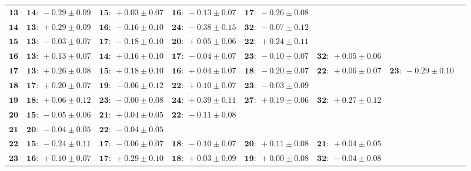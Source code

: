 \documentclass[letter,12pt]{article}
\begin{document}
\begin{landscape}
    \begin{table}[!h]
        \footnotesize
        \begin{tabular}{r|lllllll}
            \hline
            \( \mathbf{13} \)& \( \mathbf{14:}~-0.29 \pm 0.09 \)& \( \mathbf{15:}~+0.03 \pm 0.07 \)& \( \mathbf{16:}~-0.13 \pm 0.07 \)& \( \mathbf{17:}~-0.26 \pm 0.08 \)\\ 
            \( \mathbf{14} \)& \( \mathbf{13:}~+0.29 \pm 0.09 \)& \( \mathbf{16:}~-0.16 \pm 0.10 \)& \( \mathbf{24:}~-0.38 \pm 0.15 \)& \( \mathbf{32:}~-0.07 \pm 0.12 \)\\ 
            \( \mathbf{15} \)& \( \mathbf{13:}~-0.03 \pm 0.07 \)& \( \mathbf{17:}~-0.18 \pm 0.10 \)& \( \mathbf{20:}~+0.05 \pm 0.06 \)& \( \mathbf{22:}~+0.24 \pm 0.11 \)\\ 
            \( \mathbf{16} \)& \( \mathbf{13:}~+0.13 \pm 0.07 \)& \( \mathbf{14:}~+0.16 \pm 0.10 \)& \( \mathbf{17:}~-0.04 \pm 0.07 \)& \( \mathbf{23:}~-0.10 \pm 0.07 \)& \( \mathbf{32:}~+0.05 \pm 0.06 \)\\ 
            \( \mathbf{17} \)& \( \mathbf{13:}~+0.26 \pm 0.08 \)& \( \mathbf{15:}~+0.18 \pm 0.10 \)& \( \mathbf{16:}~+0.04 \pm 0.07 \)& \( \mathbf{18:}~-0.20 \pm 0.07 \)& \( \mathbf{22:}~+0.06 \pm 0.07 \)& \( \mathbf{23:}~-0.29 \pm 0.10 \)\\ 
            \( \mathbf{18} \)& \( \mathbf{17:}~+0.20 \pm 0.07 \)& \( \mathbf{19:}~-0.06 \pm 0.12 \)& \( \mathbf{22:}~+0.10 \pm 0.07 \)& \( \mathbf{23:}~-0.03 \pm 0.09 \)\\ 
            \( \mathbf{19} \)& \( \mathbf{18:}~+0.06 \pm 0.12 \)& \( \mathbf{23:}~-0.00 \pm 0.08 \)& \( \mathbf{24:}~+0.39 \pm 0.11 \)& \( \mathbf{27:}~+0.19 \pm 0.06 \)& \( \mathbf{32:}~+0.27 \pm 0.12 \)\\ 
            \( \mathbf{20} \)& \( \mathbf{15:}~-0.05 \pm 0.06 \)& \( \mathbf{21:}~+0.04 \pm 0.05 \)& \( \mathbf{22:}~-0.11 \pm 0.08 \)\\ 
            \( \mathbf{21} \)& \( \mathbf{20:}~-0.04 \pm 0.05 \)& \( \mathbf{22:}~-0.04 \pm 0.05 \)\\ 
            \( \mathbf{22} \)& \( \mathbf{15:}~-0.24 \pm 0.11 \)& \( \mathbf{17:}~-0.06 \pm 0.07 \)& \( \mathbf{18:}~-0.10 \pm 0.07 \)& \( \mathbf{20:}~+0.11 \pm 0.08 \)& \( \mathbf{21:}~+0.04 \pm 0.05 \)\\ 
            \( \mathbf{23} \)& \( \mathbf{16:}~+0.10 \pm 0.07 \)& \( \mathbf{17:}~+0.29 \pm 0.10 \)& \( \mathbf{18:}~+0.03 \pm 0.09 \)& \( \mathbf{19:}~+0.00 \pm 0.08 \)& \( \mathbf{32:}~-0.04 \pm 0.08 \)\\ 

\end{tabular}
\end{table}
\end{landscape}
\end{document}
